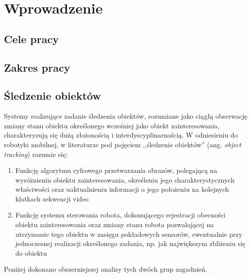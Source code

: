 \chapter{Wprowadzenie}
\label{cha:wprowadzenie}


\section{Cele pracy}
\label{sec:celePracy}


\section{Zakres pracy}
\label{sec:zakresPracy}

\section{Śledzenie obiektów}
\label{sec:Sledzenie_obiektow}
Systemy realizujące zadanie śledzenia obiektów, rozumiane jako ciągłą obserwację zmiany stanu obiektu określonego wcześniej jako obiekt zainteresowania, charakteryzują się dużą złożonością i interdyscyplinarnością. W odniesieniu do robotyki mobilnej, w literaturze pod pojęciem ,,śledzenie obiektów'' (ang. \textit{object tracking}) rozumie się:

\begin{enumerate}

	\item \label{itm:Algorytm_przetwarzania_obrazow} Funkcję algorytmu cyfrowego przetwarzania obrazów, polegającą na wyróżnieniu obiektu zainteresowania, określeniu jego charakterystycznych właściwości oraz uaktualnieniu informacji o jego położeniu na kolejnych klatkach sekwencji video

	\item \label{itm:System_sterowania} Funkcję systemu sterowania robota, dokonującego rejestracji obecności obiektu zainteresowania oraz zmiany stanu robota pozwalającej na utrzymanie tego obiektu w zasięgu pokładowych sensorów, ewentualnie przy jednoczesnej realizacji określonego zadania, np. jak największym zbliżeniu się do obiektu
	
\end{enumerate}

Poniżej dokonano obszerniejszej analizy tych dwóch grup zagadnień.









